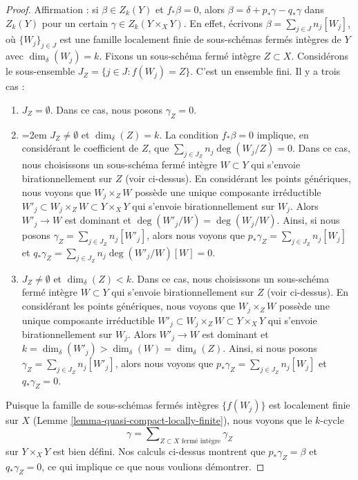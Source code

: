 \begin{proof}
\medskip\noindent
Affirmation : si $\beta \in Z_k(Y)$ et $f_*\beta = 0$, alors
$\beta = \delta + p_*\gamma - q_*\gamma$ dans $Z_k(Y)$ pour un certain
$\gamma \in Z_k(Y \times_X Y)$. En effet, écrivons $\beta = \sum_{j \in J} n_j[W_j]$,
où $\{W_j\}_{j \in J}$ est une famille localement finie de sous-schémas fermés
intègres de $Y$ avec $\dim_\delta(W_j) = k$.
Fixons un sous-schéma fermé intègre $Z \subset X$. Considérons le sous-ensemble
$J_Z = \{j \in J : f(W_j) = Z\}$. C'est un ensemble fini. Il y a trois
cas :
\begin{enumerate}
\item $J_Z = \emptyset$. Dans ce cas, nous posons $\gamma_Z = 0$.
\item {\emergencystretch=2em $J_Z \not = \emptyset$ et $\dim_\delta(Z) = k$.
La condition $f_*\beta = 0$ implique, en considérant le
coefficient de $Z$, que $\sum_{j \in J_Z} n_j\deg(W_j/Z) = 0$.
Dans ce cas, nous choisissons un sous-schéma fermé intègre $W \subset Y$
qui s'envoie birationnellement sur $Z$ (voir ci-dessus). En considérant les points
génériques, nous voyons que $W_j \times_Z W$ possède une unique composante
irréductible $W'_j \subset W_j \times_Z W \subset Y \times_X Y$
qui s'envoie birationnellement sur $W_j$. Alors $W'_j \to W$ est dominant
et $\deg(W'_j/W) = \deg(W_j/W)$. Ainsi, si nous posons
$\gamma_Z = \sum_{j \in J_Z} n_j[W'_j]$,
alors nous voyons que
$p_*\gamma_Z = \sum_{j \in J_Z} n_j[W_j]$ et
$q_*\gamma_Z = \sum_{j \in J_Z} n_j\deg(W'_j/W)[W] = 0$.\par}
\item $J_Z \not = \emptyset$ et $\dim_\delta(Z) < k$.
Dans ce cas, nous choisissons un sous-schéma fermé intègre $W \subset Y$
qui s'envoie birationnellement sur $Z$ (voir ci-dessus). En considérant les points
génériques, nous voyons que $W_j \times_Z W$ possède une unique composante
irréductible $W'_j \subset W_j \times_Z W \subset Y \times_X Y$
qui s'envoie birationnellement sur $W_j$. Alors $W'_j \to W$ est dominant
et $k = \dim_\delta(W'_j) > \dim_\delta(W) = \dim_\delta(Z)$.
Ainsi, si nous posons $\gamma_Z = \sum_{j \in J_Z} n_j[W'_j]$,
alors nous voyons que
$p_*\gamma_Z = \sum_{j \in J_Z} n_j[W_j]$ et
$q_*\gamma_Z = 0$.
\end{enumerate}
Puisque la famille de sous-schémas fermés intègres $\{f(W_j)\}$
est localement finie sur $X$
(Lemme \ref{lemma-quasi-compact-locally-finite}),
nous voyons que le $k$-cycle
$$
\gamma = \sum\nolimits_{Z \subset X\text{ fermé intègre}} \gamma_Z
$$
sur $Y \times_X Y$ est bien défini. Nos calculs ci-dessus montrent que
$p_*\gamma_Z = \beta$ et $q_*\gamma_Z = 0$, ce qui implique
ce que nous voulions démontrer.
\end{proof}














